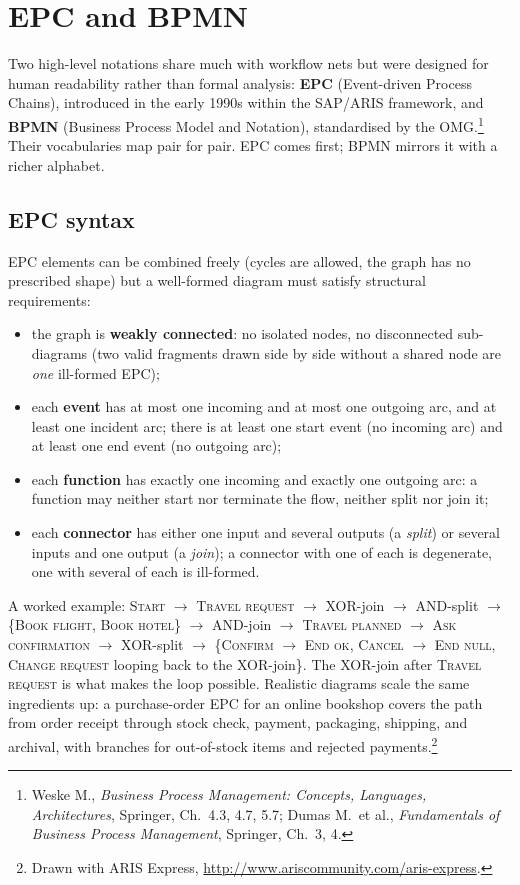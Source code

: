 \section{EPC and BPMN}

Two high-level notations share much with workflow nets but were designed for human readability rather than formal analysis: \textbf{EPC} (Event-driven Process Chains), introduced in the early 1990s within the SAP/ARIS framework, and \textbf{BPMN} (Business Process Model and Notation), standardised by the OMG.\footnote{Weske M., \emph{Business Process Management: Concepts, Languages, Architectures}, Springer, Ch.~4.3, 4.7, 5.7; Dumas M.\ et al., \emph{Fundamentals of Business Process Management}, Springer, Ch.~3, 4.} Their vocabularies map pair for pair. EPC comes first; BPMN mirrors it with a richer alphabet.

\subsection{EPC syntax}

EPC elements can be combined freely (cycles are allowed, the graph has no prescribed shape) but a well-formed diagram must satisfy structural requirements:
\begin{itemize}
  \item the graph is \textbf{weakly connected}: no isolated nodes, no disconnected sub-diagrams (two valid fragments drawn side by side without a shared node are \emph{one} ill-formed EPC);
  \item each \textbf{event} has at most one incoming and at most one outgoing arc, and at least one incident arc; there is at least one start event (no incoming arc) and at least one end event (no outgoing arc);
  \item each \textbf{function} has exactly one incoming and exactly one outgoing arc: a function may neither start nor terminate the flow, neither split nor join it;
  \item each \textbf{connector} has either one input and several outputs (a \emph{split}) or several inputs and one output (a \emph{join}); a connector with one of each is degenerate, one with several of each is ill-formed.
\end{itemize}

A worked example: \textsc{Start} $\to$ \textsc{Travel request} $\to$ XOR-join $\to$ AND-split $\to$ \{\textsc{Book flight}, \textsc{Book hotel}\} $\to$ AND-join $\to$ \textsc{Travel planned} $\to$ \textsc{Ask confirmation} $\to$ XOR-split $\to$ \{\textsc{Confirm} $\to$ \textsc{End ok}, \textsc{Cancel} $\to$ \textsc{End null}, \textsc{Change request} looping back to the XOR-join\}. The XOR-join after \textsc{Travel request} is what makes the loop possible. Realistic diagrams scale the same ingredients up: a purchase-order EPC for an online bookshop covers the path from order receipt through stock check, payment, packaging, shipping, and archival, with branches for out-of-stock items and rejected payments.\footnote{Drawn with ARIS Express, \url{http://www.ariscommunity.com/aris-express}.}

